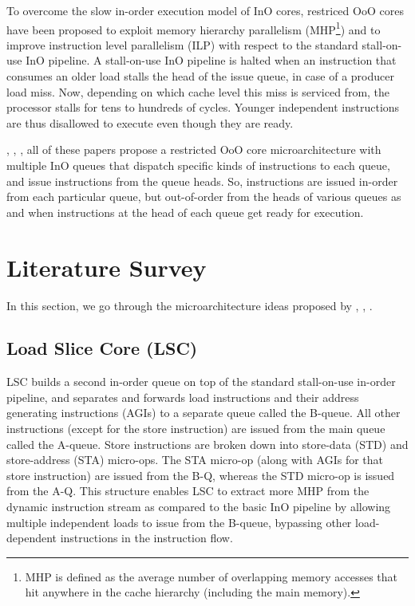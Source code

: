 \documentclass[a4paper,12pt, final]{report}
\begin{document}
To overcome the slow in-order execution model of InO cores, restriced OoO cores have been proposed to exploit memory hierarchy parallelism (MHP\footnote[1]{MHP is defined as the average number of overlapping memory accesses that hit anywhere in the cache hierarchy (including the main memory).}) and to improve instruction level parallelism (ILP) with respect to the standard stall-on-use InO pipeline. A stall-on-use InO pipeline is halted when an instruction that consumes an older load stalls the head of the issue queue, in case of a producer load miss. Now, depending on which cache level this miss is serviced from, the processor stalls for tens to hundreds of cycles. Younger independent instructions are thus disallowed to execute even though they are ready.

\cite{loadslice}, \cite{forwardslice}, \cite{freeflow}, all of these papers propose a restricted OoO core microarchitecture with multiple InO queues that dispatch specific kinds of instructions to each queue, and issue instructions from the queue heads. So, instructions are issued in-order from each particular queue, but out-of-order from the heads of various queues as and when instructions at the head of each queue get ready for execution.

\chapter{Literature Survey}

In this section, we go through the microarchitecture ideas proposed by \cite{loadslice}, \cite{forwardslice}, \cite{freeflow}.

\section{Load Slice Core (LSC)}

LSC builds a second in-order queue on top of the standard stall-on-use in-order pipeline, and separates and forwards load instructions and their address generating instructions (AGIs) to a separate queue called the B-queue. All other instructions (except for the store instruction) are issued from the main queue called the A-queue. Store instructions are broken down into store-data (STD) and store-address (STA) micro-ops. The STA micro-op (along with AGIs for that store instruction) are issued from the B-Q, whereas the STD micro-op is issued from the A-Q. This structure enables LSC to extract more MHP from the dynamic instruction stream as compared to the basic InO pipeline by allowing multiple independent loads to issue from the B-queue, bypassing other load-dependent instructions in the instruction flow.
\end{document}
